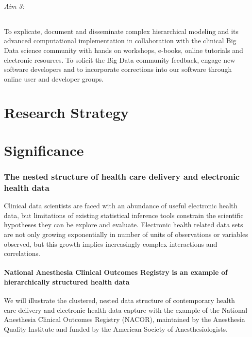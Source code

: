 \documentclass[11pt,notitlepage]{article}
\begin{document}
\paragraph*{Aim 3:} To explicate, document and disseminate complex hierarchical modeling and its advanced computational implementation in collaboration with the clinical Big Data science community with hands on workshops, e-books, online tutorials and electronic resources. To solicit the Big Data community feedback, engage new software developers and to incorporate corrections into our software through online user and developer groups.

\part*{Research Strategy}

\part*{Significance}

\section*{The nested structure of health care delivery and electronic health data}
Clinical data scientists are faced with an abundance of useful electronic health data, but limitations of existing statistical inference tools constrain the scientific hypotheses they can be explore and evaluate. Electronic health related data sets are not only growing exponentially in number of units of observations or variables observed, but this growth implies increasingly complex interactions and correlations. 

\subsection*{National Anesthesia Clinical Outcomes Registry is an example of hierarchically structured health data}
We will illustrate the clustered, nested data structure of contemporary health care delivery and electronic health data capture with the example of the National Anesthesia Clinical Outcomes Registry (NACOR), maintained by the Anesthesia Quality Institute and funded by the American Society of Anesthesiologists. 
\end{document}
